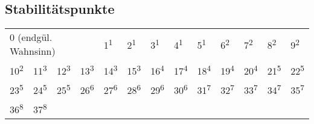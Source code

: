 \documentclass[a4paper,twoside]{article}
\begin{document}
\begin{Row}
    \begin{Cell}{2}
        \subsection*{Stabilitätspunkte}
        \begin{tabular}{ | m{2.5mm} m{2.5mm} m{2.5mm} m{2.5mm} m{2.5mm} m{2.5mm} m{2.5mm} m{2.5mm} m{2.5mm} m{2.5mm} m{2.5mm} m{2.5mm} m{4mm} | }
            \hline
            \multicolumn{4}{|l}{\footnotesize{0 \tiny{(endgül. Wahnsinn)}}} &
            \footnotesize{1\textsuperscript{1}} &
            \footnotesize{2\textsuperscript{1}} &
            \footnotesize{3\textsuperscript{1}} &
            \footnotesize{4\textsuperscript{1}} &
            \footnotesize{5\textsuperscript{1}} &
            \footnotesize{6\textsuperscript{2}} &
            \footnotesize{7\textsuperscript{2}} &
            \footnotesize{8\textsuperscript{2}} &
            \footnotesize{9\textsuperscript{2}} \\
            \footnotesize{10\textsuperscript{2}} &
            \footnotesize{11\textsuperscript{3}} &
            \footnotesize{12\textsuperscript{3}} &
            \footnotesize{13\textsuperscript{3}} &
            \footnotesize{14\textsuperscript{3}} &
            \footnotesize{15\textsuperscript{3}} &
            \footnotesize{16\textsuperscript{4}} &
            \footnotesize{17\textsuperscript{4}} &
            \footnotesize{18\textsuperscript{4}} &
            \footnotesize{19\textsuperscript{4}} &
            \footnotesize{20\textsuperscript{4}} &
            \footnotesize{21\textsuperscript{5}} &
            \footnotesize{22\textsuperscript{5}} \\
            \footnotesize{23\textsuperscript{5}} &
            \footnotesize{24\textsuperscript{5}} &
            \footnotesize{25\textsuperscript{5}} &
            \footnotesize{26\textsuperscript{6}} &
            \footnotesize{27\textsuperscript{6}} &
            \footnotesize{28\textsuperscript{6}} &
            \footnotesize{29\textsuperscript{6}} &
            \footnotesize{30\textsuperscript{6}} &
            \footnotesize{31\textsuperscript{7}} &
            \footnotesize{32\textsuperscript{7}} &
            \footnotesize{33\textsuperscript{7}} &
            \footnotesize{34\textsuperscript{7}} &
            \footnotesize{35\textsuperscript{7}} \\
            \footnotesize{36\textsuperscript{8}} &
            \footnotesize{37\textsuperscript{8}} &

\end{tabular}
\end{Cell}
\end{Row}
\end{document}
